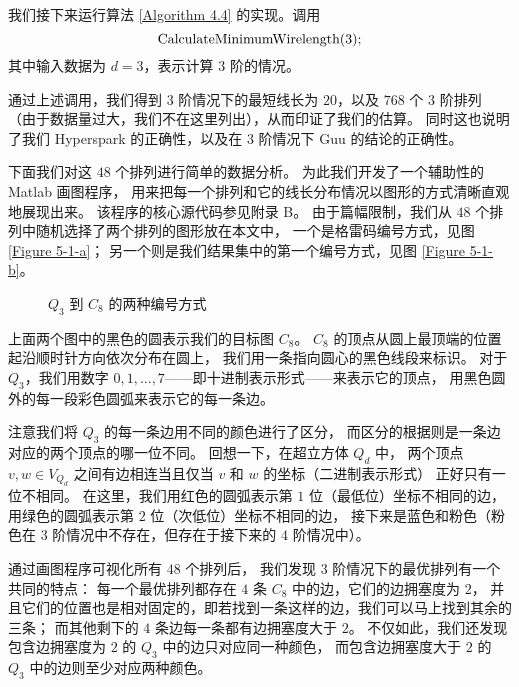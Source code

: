 我们接下来运行算法 \ref{Algorithm 4.4} 的实现。调用
\begin{equation*}
\textnormal{CalculateMinimumWirelength}(3);
\end{equation*}
其中输入数据为 $d = 3$，表示计算 $3$ 阶的情况。

通过上述调用，我们得到 $3$ 阶情况下的最短线长为 $20$，以及 $768$ 个 $3$ 阶排列
（由于数据量过大，我们不在这里列出），从而印证了我们的估算。
同时这也说明了我们 Hyperspark 的正确性，以及在 $3$ 阶情况下 Guu 的结论的正确性。

下面我们对这 $48$ 个排列进行简单的数据分析。
为此我们开发了一个辅助性的 Matlab 画图程序，
用来把每一个排列和它的线长分布情况以图形的方式清晰直观地展现出来。
该程序的核心源代码参见附录 B。
由于篇幅限制，我们从 $48$ 个排列中随机选择了两个排列的图形放在本文中，
一个是格雷码编号方式，见图 \ref{Figure 5-1-a}；
另一个则是我们结果集中的第一个编号方式，见图 \ref{Figure 5-1-b}。

\begin{figure}[h!]
	\centering
	\subfloat[格雷码编号方式]{
		
		\label{Figure 5-1-a}
	}
	\subfloat[另一种最优编号方式]{
		
		\label{Figure 5-1-b}
	}
	\caption{$Q_3$ 到 $C_{8}$ 的两种编号方式}
	\label{Figure 5-1}
\end{figure}

上面两个图中的黑色的圆表示我们的目标图 $C_8$。
$C_8$ 的顶点从圆上最顶端的位置起沿顺时针方向依次分布在圆上，
我们用一条指向圆心的黑色线段来标识。
对于 $Q_3$，我们用数字 $0, 1, \dots, 7$——即十进制表示形式——来表示它的顶点，
用黑色圆外的每一段彩色圆弧来表示它的每一条边。

注意我们将 $Q_3$ 的每一条边用不同的颜色进行了区分，
而区分的根据则是一条边对应的两个顶点的哪一位不同。
回想一下，在超立方体 $Q_d$ 中，
两个顶点 $v, w \in V_{Q_d}$ 之间有边相连当且仅当 $v$ 和 $w$ 的坐标（二进制表示形式）
正好只有一位不相同。
在这里，我们用红色的圆弧表示第 $1$ 位（最低位）坐标不相同的边，
用绿色的圆弧表示第 $2$ 位（次低位）坐标不相同的边，
接下来是蓝色和粉色（粉色在 $3$ 阶情况中不存在，但存在于接下来的 $4$ 阶情况中）。

通过画图程序可视化所有 $48$ 个排列后，
我们发现 $3$ 阶情况下的最优排列有一个共同的特点：
每一个最优排列都存在 $4$ 条 $C_8$ 中的边，它们的边拥塞度为 $2$，
并且它们的位置也是相对固定的，即若找到一条这样的边，我们可以马上找到其余的三条；
而其他剩下的 $4$ 条边每一条都有边拥塞度大于 $2$。
不仅如此，我们还发现包含边拥塞度为 $2$ 的 $Q_3$ 中的边只对应同一种颜色，
而包含边拥塞度大于 $2$ 的 $Q_3$ 中的边则至少对应两种颜色。

